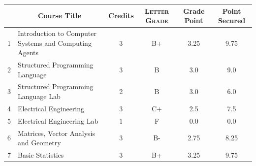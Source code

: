 \documentclass[11pt]{article}
\newcommand*{\numtwo}[1]{\pgfmathprintnumber[
                    fixed, precision=2, fixed zerofill=true]{#1}}
\begin{document}
                \begin{center}
                    \renewcommand{\arraystretch}{1.08}
                    
                \begin{tabular}{|c|l|c|>{\scshape}c|c|c|}
                \hline  \rule[-1ex]{0pt}{3.5ex} {\centering{\bf Course Code}} &  \multicolumn{1}{c|}{\textbf{Course Title}}  & {\bf Credits} & {\bf Letter Grade} & {\bf Grade Point} & {\bf Point Secured}  \\ 
                \hline   1 &  Introduction to Computer Systems and Computing Agents		 & 3 & B+ & 3.25 & 9.75 \\ %
                \hline   2 &  Structured Programming Language		 & 3 & B & 3.0 & 9.0 \\ %
                \hline   3 &  Structured Programming Language Lab		 & 2 & B & 3.0 & 6.0 \\ %
                \hline   4 &  Electrical Engineering		 & 3 & C+ & 2.5 & 7.5 \\ %
                \hline   5 &  Electrical Engineering Lab		 & 1 & F & 0.0 & 0.0 \\ %
                \hline   6 &  Matrices, Vector Analysis and Geometry		 & 3 & B- & 2.75 & 8.25 \\ %
                \hline   7 &  Basic Statistics		 & 3 & B+ & 3.25 & 9.75 \\ %

\hline                %
                \end{tabular}
                \end{center}
                \renewcommand{\arraystretch}{1.03}
\end{document}
